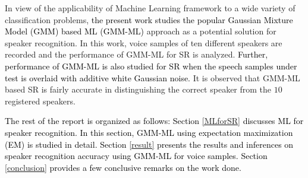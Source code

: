 \documentclass{article}
\begin{document}
{In view of the applicability of {Machine Learning} framework to a wide variety of classification problems,  \textcolor{black}{the present work studies the popular Gaussian Mixture Model (GMM) based ML (GMM-ML) \cite{3}} approach as a potential solution for speaker recognition. In this work, voice samples of ten different speakers are recorded and the performance of GMM-ML for SR is analyzed. \textcolor{black}{Further, performance of GMM-ML is also studied for SR when the speech samples under test is overlaid with additive white Gaussian noise.} It is observed that GMM-ML based SR is fairly accurate in distinguishing the correct speaker from the $10$ registered speakers. 

\textcolor{black}{The rest of the report is organized as follows: Section \ref{MLforSR} discusses ML for speaker recognition. In this section, GMM-ML using expectation maximization (EM) is studied in detail. Section \ref{result} presents the results and inferences on speaker recognition accuracy using GMM-ML for voice samples. Section \ref{conclusion} provides a few conclusive remarks on the work done.}

}
\end{document}
